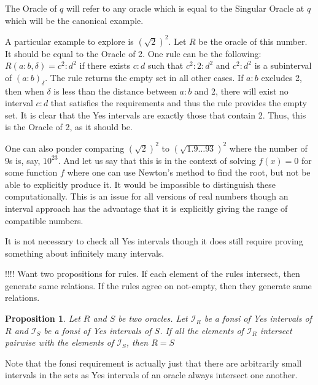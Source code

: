 \documentclass[12pt]{article}
\newtheorem{proposition}{Proposition}[section]
\begin{document}
The Oracle of $q$ will refer to any oracle which is equal to the Singular Oracle at $q$ which will be the canonical example. 

A particular example to explore is $(\sqrt{2})^2$. Let $R$ be the oracle of this number. It should be equal to the Oracle of 2. One rule can be the following: $R(a:b, \delta) = c^2:d^2$ if there exists $c:d$ such that $c^2:2:d^2$ and $c^2:d^2$ is a subinterval of $(a:b)_\delta$. The rule returns the empty set in all other cases. If $a:b$ excludes 2,  then when $\delta$ is less than the distance between $a:b$ and 2, there will exist no interval $c:d$ that satisfies the requirements and thus the rule provides the empty set. It is clear that the Yes intervals are exactly those that contain 2. Thus, this is the Oracle of 2, as it should be. 

One can also ponder comparing $(\sqrt{2})^2$ to $(\sqrt{1.9\ldots93})^2$ where the number of 9s is, say, $10^{23}$. And let us say that this is in the context of solving $f(x) = 0$ for some function $f$ where one can use Newton's method to find the root, but not be able to explicitly produce it. It would be impossible to distinguish these computationally. This is an issue for all versions of real numbers though an interval approach has the advantage that it is explicitly giving the range of compatible numbers. 

It is not necessary to check all Yes intervals though it does still require proving something about infinitely many intervals.


!!!! Want two propositions for rules. If each element of the rules intersect, then generate same relations. If the rules agree on not-empty, then they generate same relations. 

\begin{proposition}
Let $R$ and $S$ be two oracles. Let $\mathcal{I}_R$ be a fonsi of Yes intervals of $R$ and $\mathcal{I}_S$ be a fonsi of Yes intervals of $S$. If all the elements of $\mathcal{I}_R$ intersect pairwise with the elements of $\mathcal{I}_S$, then $R=S$
\end{proposition}

Note that the fonsi requirement is actually just that there are arbitrarily small intervals in the sets as Yes intervals of an oracle always intersect one another. 
\end{document}
